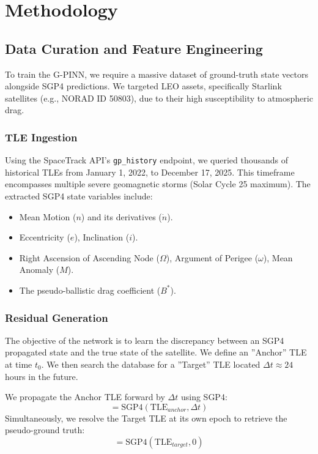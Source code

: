 \section{Methodology}

\subsection{Data Curation and Feature Engineering}
To train the G-PINN, we require a massive dataset of ground-truth state vectors alongside SGP4 predictions. We targeted LEO assets, specifically Starlink satellites (e.g., NORAD ID 50803), due to their high susceptibility to atmospheric drag.

\subsubsection{TLE Ingestion}
Using the SpaceTrack API's \texttt{gp\_history} endpoint, we queried thousands of historical TLEs from January 1, 2022, to December 17, 2025. This timeframe encompasses multiple severe geomagnetic storms (Solar Cycle 25 maximum).
The extracted SGP4 state variables include:
\begin{itemize}
    \item Mean Motion ($n$) and its derivatives ($\dot{n}$).
    \item Eccentricity ($e$), Inclination ($i$).
    \item Right Ascension of Ascending Node ($\Omega$), Argument of Perigee ($\omega$), Mean Anomaly ($M$).
    \item The pseudo-ballistic drag coefficient ($B^*$).
\end{itemize}

\subsubsection{Residual Generation}
The objective of the network is to learn the discrepancy between an SGP4 propagated state and the true state of the satellite. We define an ''Anchor'' TLE at time $t_0$. We then search the database for a ''Target'' TLE located $\Delta t \approx 24$ hours in the future.

We propagate the Anchor TLE forward by $\Delta t$ using SGP4:
\begin{equation}[\mathbf{r}_{pred}, \textbf{v}_{pred}] = \text{SGP4}(\text{TLE}_{anchor}, \Delta t)
\end{equation}
Simultaneously, we resolve the Target TLE at its own epoch to retrieve the pseudo-ground truth:
\begin{equation}[\mathbf{r}_{true}, \textbf{v}_{true}] = \text{SGP4}(\text{TLE}_{target}, 0)
\end{equation}

